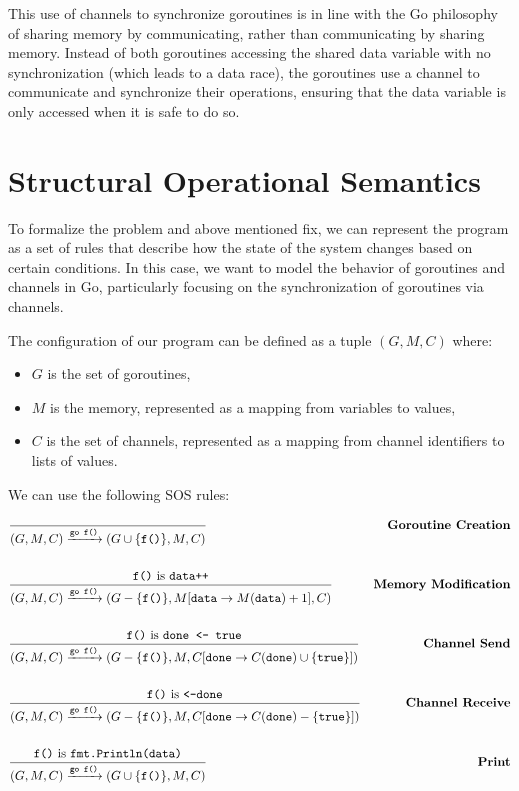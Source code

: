\documentclass[12pt]{article}
\begin{document}
This use of channels to synchronize goroutines is in line with the Go philosophy of sharing memory by communicating, rather than communicating by sharing memory. Instead of both goroutines accessing the shared data variable with no synchronization (which leads to a data race), the goroutines use a channel to communicate and synchronize their operations, ensuring that the data variable is only accessed when it is safe to do so.

\section{Structural Operational Semantics}

To formalize the problem and above mentioned fix, we can represent the program as a set of rules that describe how the state of the system changes based on certain conditions. In this case, we want to model the behavior of goroutines and channels in Go, particularly focusing on the synchronization of goroutines via channels.

The configuration of our program can be defined as a tuple $(G, M, C)$ where:

\begin{itemize}
    \item $G$ is the set of goroutines,
    \item $M$ is the memory, represented as a mapping from variables to values,
    \item $C$ is the set of channels, represented as a mapping from channel identifiers to lists of values.
\end{itemize}

We can use the following SOS rules:

\begin{align*}
& \frac{}{(G, M, C) \xrightarrow{\texttt{go f()}} (G \cup \{\texttt{f()}\}, M, C)} & \textbf{Goroutine Creation} \\
\vspace{2.5mm}\\
& \frac{\texttt{f()}\ \text{is}\ \texttt{data++}}{(G, M, C)  \xrightarrow{\texttt{go f()}} (G - \{\texttt{f()}\}, M[\texttt{data} \rightarrow M(\texttt{data}) + 1], C)} & \textbf{Memory Modification}\\
\vspace{2.5mm}\\
& \frac{\texttt{f()}\ \text{is}\ \texttt{done <- true}}{(G, M, C)  \xrightarrow{\texttt{go f()}} (G - \{\texttt{f()}\}, M, C[\texttt{done} \rightarrow C(\texttt{done}) \cup \{\texttt{true}\}])} & \textbf{Channel Send}\\
\vspace{2.5mm}\\
& \frac{\texttt{f()}\ \text{is}\ \texttt{<-done}}{(G, M, C)  \xrightarrow{\texttt{go f()}} (G - \{\texttt{f()}\}, M, C[\texttt{done} \rightarrow C(\texttt{done}) - \{\texttt{true}\}])} & \textbf{Channel Receive}\\
\vspace{2.5mm}\\
& \frac{\texttt{f()}\ \text{is}\ \texttt{fmt.Println(data)}}{(G, M, C) \xrightarrow{\texttt{go f()}} (G \cup \{\texttt{f()}\}, M, C)} & \textbf{Print}
\end{align*}
\end{document}
